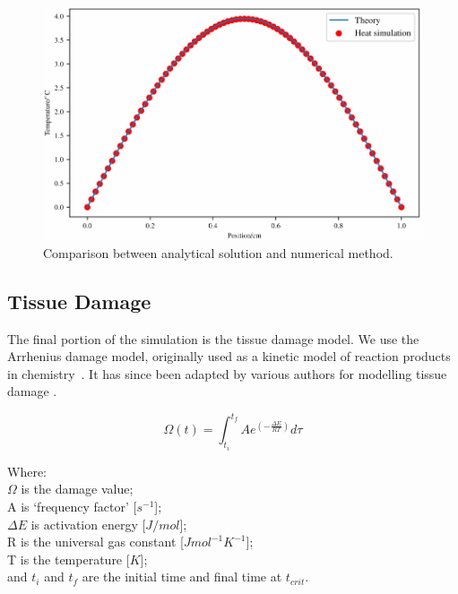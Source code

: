 \begin{figure}	
\vspace{-20pt}
	\centering
	\includegraphics[width=\columnwidth]{./ablation/images/validation.pdf}
	\caption{Comparison between analytical solution and numerical method.}
	\label{fig:validation-heat}
	\vspace{-10pt}
\end{figure}	
	
	
\subsection{Tissue Damage}
\label{sec:tissuedamage}
The final portion of the simulation is the tissue damage model. We use the Arrhenius damage model, originally used as a kinetic model of reaction products in chemistry~\cite{pearce2009relationship}. It has since been adapted by various authors for modelling tissue damage \cite{hendriques1947studies,jiang2002effects}.

\begin{equation}
\Omega(t)=\int^{t_{f}}_{t_i} Ae^{(-\tfrac{\Delta E}{RT})}d\tau
\end{equation}


\noindent Where:\\
	\indent $\Omega$ is the damage value; \\
	\indent A is `frequency factor' [$s^{-1}$];\\
	\indent $\Delta E$ is activation energy [$J/mol$];\\
	\indent R is the universal gas constant [$J mol^{-1} K^{-1}$];\\
	\indent T is the temperature [$K$];\\
	\indent and $t_i$ and $t_f$ are the initial time and final time at $t_{crit}$.\\

